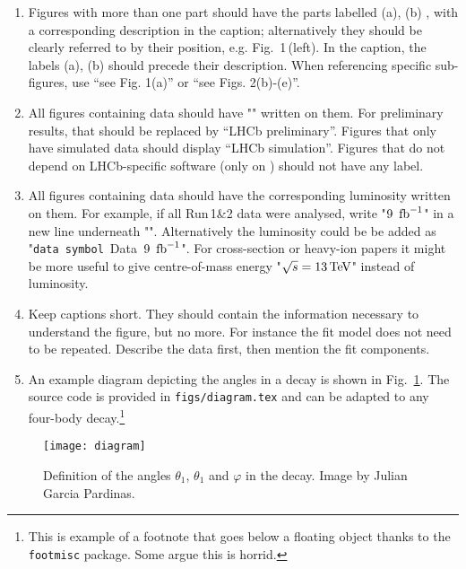 \begin{enumerate}
\item Figures with more than one part should have the parts labelled
  (a), (b) \etc, with a corresponding description in the caption;
  alternatively they should be clearly referred to by their position,
  e.g. Fig.~1\,(left). In the caption, the labels (a), (b) \etc should
  precede their description. When referencing specific sub-figures,
  use ``see Fig. 1(a)'' or ``see Figs. 2(b)-(e)''.

\item All figures containing \lhcb data should have "{\lhcb}" written on
  them.  For preliminary results, that should be replaced by ``LHCb preliminary''.
  Figures that only have simulated data should display ``LHCb simulation''.
  Figures that do not depend on LHCb-specific software (\eg only on \pythia)
  should not have any label.
  
  \item All figures containing \lhcb data should have the corresponding luminosity written on them.
For example, if all  Run\,1\&2 data were analysed, write "$9\ \text{\,fb}^{-1}$" in a new line underneath  "{\lhcb}".
Alternatively the luminosity could be  be added as  \mbox{"{\tt data symbol} Data $9\ \text{\,fb}^{-1}$"}.
For cross-section or heavy-ion papers it might be more useful to give centre-of-mass energy "$\sqrt{s} = 13 \text{\,Te\kern -0.1em V}$" instead of luminosity.

\item Keep captions short. They should contain the information necessary to understand the figure, but no more. For instance the fit model does not need to be repeated. Describe the data first, then mention the fit components.

\item An example diagram depicting the angles in a \decay{\Bs}{\Kstarz\Kstarzb} decay is shown in
  Fig.~\ref{fig:diagram}.
  The source code is provided in \verb!figs/diagram.tex! and can be adapted to any four-body
  decay.\footnote{This is example of a footnote that goes below a floating object thanks to the {\tt footmisc}
    package. Some argue this is horrid.}
\end{enumerate}
\begin{figure}[b] %
  \begin{center}
    \texttt{[image: diagram]}
  \end{center}
  \caption{Definition of the angles $\theta_1$, $\theta_1$ and $\varphi$
   in the \decay{\Bs}{\Kstarz\Kstarzb} decay. Image by Julian Garcia Pardinas.}
  \label{fig:diagram}
\end{figure}

